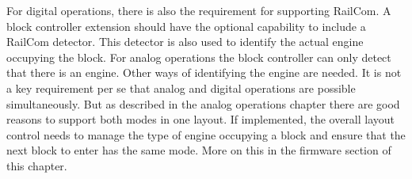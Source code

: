 For digital operations, there is also the requirement for supporting RailCom. A block controller extension should have the optional capability to include a RailCom detector. This detector is also used to identify the actual engine occupying the block. For analog operations the block controller can only detect that there is an engine. Other ways of identifying the engine are needed. It is not a key requirement per se that analog and digital operations are possible simultaneously. But as described in the analog operations chapter there are good reasons to support both modes in one layout. If implemented, the overall layout control needs to manage the type of engine occupying a block and ensure that the next block to enter has the same mode. More on this in the firmware section of this chapter.
